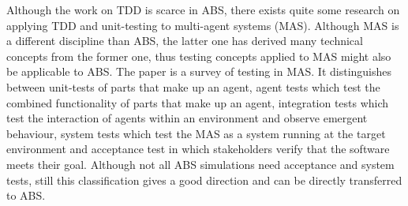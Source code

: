 Although the work on TDD is scarce in ABS, there exists quite some research on applying TDD and unit-testing to multi-agent systems (MAS). Although MAS is a different discipline than ABS, the latter one has derived many technical concepts from the former one, thus testing concepts applied to MAS might also be applicable to ABS. The paper \cite{nguyen_testing_2011} is a survey of testing in MAS. It distinguishes between unit-tests of parts that make up an agent, agent tests which test the combined functionality of parts that make up an agent, integration tests which test the interaction of agents within an environment and observe emergent behaviour, system tests which test the MAS as a system running at the target environment and acceptance test in which stakeholders verify that the software meets their goal. Although not all ABS simulations need acceptance and system tests, still this classification gives a good direction and can be directly transferred to ABS.  %



